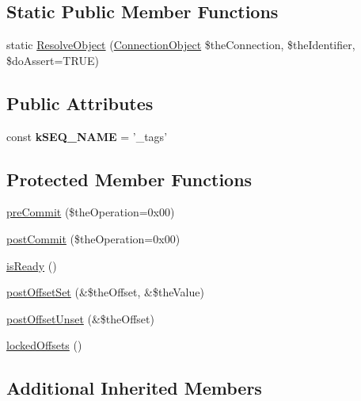 \subsection*{Static Public Member Functions}
\begin{DoxyCompactItemize}
\item 
static \hyperlink{class_ontology_wrapper_1_1_tag_ab9e3d10fa0936027b6b0286b0cf77482}{Resolve\-Object} (\hyperlink{class_ontology_wrapper_1_1_connection_object}{Connection\-Object} \$the\-Connection, \$the\-Identifier, \$do\-Assert=T\-R\-U\-E)
\end{DoxyCompactItemize}
\subsection*{Public Attributes}
\begin{DoxyCompactItemize}
\item 
\hypertarget{class_ontology_wrapper_1_1_tag_aed2bdf74576154de4a2cbf7dfd5f9ea5}{const {\bfseries k\-S\-E\-Q\-\_\-\-N\-A\-M\-E} = '\-\_\-tags'}\label{class_ontology_wrapper_1_1_tag_aed2bdf74576154de4a2cbf7dfd5f9ea5}

\end{DoxyCompactItemize}
\subsection*{Protected Member Functions}
\begin{DoxyCompactItemize}
\item 
\hyperlink{class_ontology_wrapper_1_1_tag_a99ba84fc4fbbfc815dc60b2da6fd067d}{pre\-Commit} (\$the\-Operation=0x00)
\item 
\hyperlink{class_ontology_wrapper_1_1_tag_a6edfdc7fca0215a2456912f83893ef99}{post\-Commit} (\$the\-Operation=0x00)
\item 
\hyperlink{class_ontology_wrapper_1_1_tag_a43aac595d9e78147643e4c6136efa2b1}{is\-Ready} ()
\item 
\hyperlink{class_ontology_wrapper_1_1_tag_a9cc2af6aacbb8bbc52d4a4a641a2ae25}{post\-Offset\-Set} (\&\$the\-Offset, \&\$the\-Value)
\item 
\hyperlink{class_ontology_wrapper_1_1_tag_acdee636ad46bbe434fd47635a06d4495}{post\-Offset\-Unset} (\&\$the\-Offset)
\item 
\hyperlink{class_ontology_wrapper_1_1_tag_a191b408968b0d9bc9e8e2e8fadd24060}{locked\-Offsets} ()
\end{DoxyCompactItemize}
\subsection*{Additional Inherited Members}


